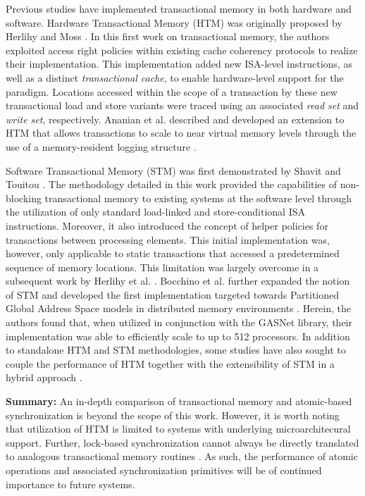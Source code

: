 Previous studies have implemented transactional memory in both hardware and software.
Hardware Transactional Memory (HTM) was originally proposed by Herlihy and Moss \cite{herlihy1993lockfree}.
In this first work on transactional memory, the authors exploited access right policies within existing cache coherency protocols to realize their implementation.
This implementation added new ISA-level instructions, as well as a distinct \textit{transactional cache}, to enable hardware-level support for the paradigm.
Locations accessed within the scope of a transaction by these new transactional load and store variants were traced using an associated \textit{read set} and \textit{write set}, respectively.
Ananian et al. described and developed an extension to HTM that allows transactions to scale to near virtual memory levels through the use of a memory-resident logging structure \cite{ananian2006unbounded}.

Software Transactional Memory (STM) was first demonstrated by Shavit and Touitou \cite{shavit1995softwaretm}.
The methodology detailed in this work provided the capabilities of non-blocking transactional memory to existing systems at the software level through the utilization of only standard load-linked and store-conditional ISA instructions.
Moreover, it also introduced the concept of helper policies for transactions between processing elements.
This initial implementation was, however, only applicable to static transactions that accessed a predetermined sequence of memory locations.
This limitation was largely overcome in a subsequent work by Herlihy et al. \cite{herlihy2003stmdsds}.
Bocchino et al. further expanded the notion of STM and developed the first implementation targeted towards Partitioned Global Address Space models in distributed memory environments \cite{bocchino2008stm}.
Herein, the authors found that, when utilized in conjunction with the GASNet library, their implementation was able to efficiently scale to up to 512 processors.
In addition to standalone HTM and STM methodologies, some studies have also sought to couple the performance of HTM together with the extensibility of STM in a hybrid approach \cite{baugh2008using}.

\textbf{Summary:} An in-depth comparison of transactional memory and atomic-based synchronization is beyond the scope of this work.
However, it is worth noting that utilization of HTM is limited to systems with underlying microarchitecural support.
Further, lock-based synchronization cannot always be directly translated to analogous transactional memory routines \cite{blundell2006subtleties}.
As such, the performance of atomic operations and associated synchronization primitives will be of continued importance to future systems.

